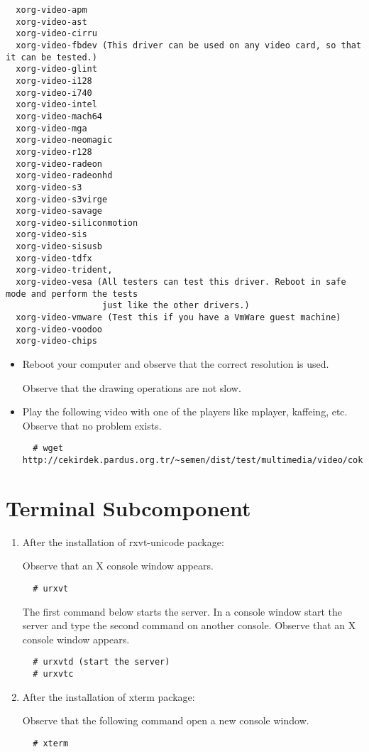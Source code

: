 \documentclass[a4paper,10pt]{article}
\begin{document}
\begin{enumerate}
\begin{verbatim}
  xorg-video-apm 
  xorg-video-ast
  xorg-video-cirru
  xorg-video-fbdev (This driver can be used on any video card, so that it can be tested.)
  xorg-video-glint
  xorg-video-i128
  xorg-video-i740
  xorg-video-intel
  xorg-video-mach64
  xorg-video-mga
  xorg-video-neomagic
  xorg-video-r128
  xorg-video-radeon
  xorg-video-radeonhd
  xorg-video-s3
  xorg-video-s3virge
  xorg-video-savage
  xorg-video-siliconmotion
  xorg-video-sis
  xorg-video-sisusb
  xorg-video-tdfx
  xorg-video-trident,
  xorg-video-vesa (All testers can test this driver. Reboot in safe mode and perform the tests
                   just like the other drivers.)
  xorg-video-vmware (Test this if you have a VmWare guest machine)
  xorg-video-voodoo
  xorg-video-chips
\end{verbatim}

\begin{itemize}
  \item Reboot your computer and observe that the correct resolution is used.

  Observe that the drawing operations are not slow.
  \item Play the following video with one of the players like mplayer, kaffeing, etc. Observe that no problem exists.
  \begin{verbatim}
  # wget http://cekirdek.pardus.org.tr/~semen/dist/test/multimedia/video/cokluortam/DVD.mpg
  \end{verbatim}
\end{itemize}

\end{enumerate}

\section{Terminal Subcomponent}
\begin{enumerate}
  \item After the installation of rxvt-unicode package:

  Observe that an X console window appears.
  \begin{verbatim}
  # urxvt
  \end{verbatim}

  The first command below starts the server. In a console window start the server and type the second command on another console.
Observe that an X console window appears.
  \begin{verbatim}
  # urxvtd (start the server)
  # urxvtc
  \end{verbatim}

  \item After the installation of xterm package:

  Observe that the following command open a new console window.
  \begin{verbatim}
  # xterm
  \end{verbatim}
\end{enumerate}
\end{document}
